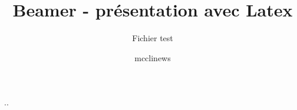 \documentclass[t,12pt]{beamer}
\title{Beamer - présentation avec Latex}
\subtitle{Fichier test}
\author{mcclinews}
\date{\oldstylenums{Mai 2007}}
\begin{document}
 ..
 
\end{document}

